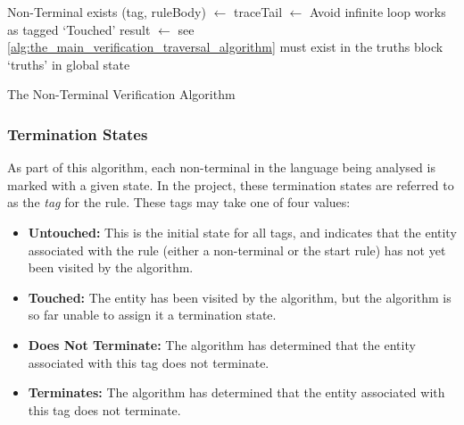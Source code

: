 \begin{algorithm}[!htb]
\begin{algorithmic}
    \State {}
        \State {}
    \Else
            \Comment Non-Terminal exists
            \State (tag, ruleBody) $\gets$ 
                \State {}
            \Else
                \State {}
                \State traceTail $\gets$ 
                    \Comment Avoid infinite loop
                    \State {} 
                    \Comment works as tagged `Touched'
                \Else
                    \State result $\gets$ 
                    \Comment see \autoref{alg:the_main_verification_traversal_algorithm}
                    \State {}
                    \State {}
                \EndIf
            \EndIf
        \Else
            \Comment must exist in the truths block
            \State {}
        \EndIf
    \EndIf
\EndFunction
{}
        \Comment `truths' in global state
        \State {}
    \Else
        \State {}
    \EndIf
\EndFunction
\end{algorithmic}
\caption{The Non-Terminal Verification Algorithm}
\label{alg:the_non_terminal_verification_algorithm}
\end{algorithm}

\subsubsection{Termination States} %
\label{ssub:termination_states}
As part of this algorithm, each non-terminal in the language being analysed is marked with a given state.
In the project, these termination states are referred to as the \textit{tag} for the rule.
These tags may take one of four values:
\begin{itemize}
    \item \textbf{Untouched:} This is the initial state for all tags, and indicates that the entity associated with the rule (either a non-terminal or the start rule) has not yet been visited by the algorithm.
    \item \textbf{Touched:} The entity has been visited by the algorithm, but the algorithm is so far unable to assign it a termination state.
    \item \textbf{Does Not Terminate:} The algorithm has determined that the entity associated with this tag does not terminate. 
    \item \textbf{Terminates:} The algorithm has determined that the entity associated with this tag does not terminate.
\end{itemize}


